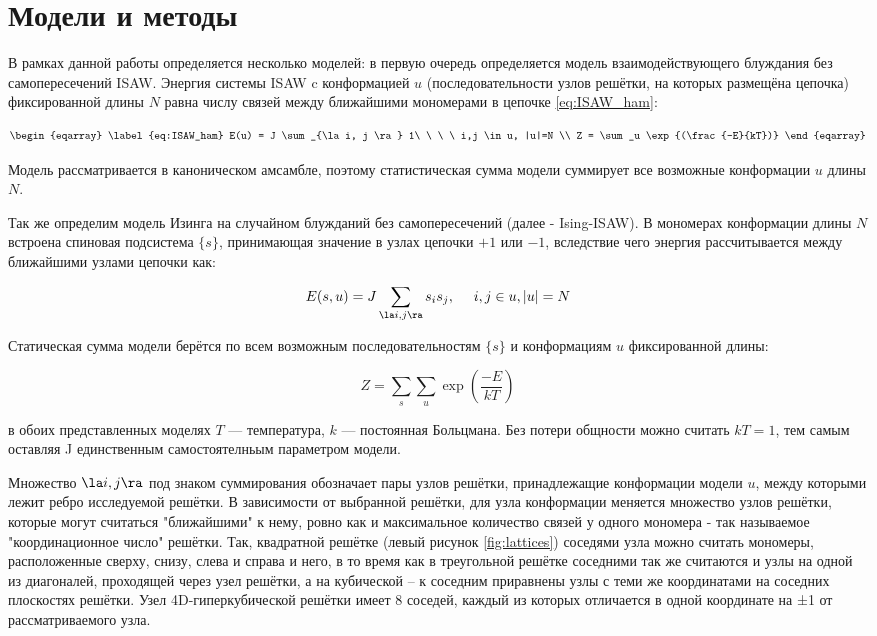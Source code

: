 \section{Модели и методы}

В рамках данной работы определяется несколько моделей: 
в первую очередь определяется модель взаимодействующего блуждания без самопересечений ISAW. 
Энергия системы ISAW c конформацией $u$ (последовательности узлов решётки, на которых размещёна цепочка) 
фиксированной длины $N$ равна числу связей между ближайшими мономерами в цепочке \eqref{eq:ISAW_ham}:

\begin{equation}
\begin{eqarray}
\label{eq:ISAW_ham}
E(u) = J \sum_{\la i, j \ra} 1\ \ \ \ i,j \in u, |u|=N \\
Z = \sum_u \exp{(\frac{-E}{kT})}
\end{eqarray}
\end{equation}

Модель рассматривается в каноническом амсамбле, поэтому статистическая сумма модели суммирует все возможные конформации $u$ длины $N$.

Так же определим модель Изинга на случайном блужданий без самопересечений (далее - Ising-ISAW).
В мономерах конформации длины $N$ встроена спиновая подсистема $\{s\}$, 
принимающая значение в узлах цепочки $+1$ или $-1$, вследствие чего энергия рассчитывается между ближайшими узлами цепочки как:

\begin{equation}
\label{eq:IsISAW_ham}
E(s,u) = J \sum_{\la i, j \ra} s_i s_j,\ \ \ \ i,j \in u, |u|=N
\end{equation}

Статическая сумма модели берётся по всем возможным последовательностям $\{s\}$ и конформациям $u$ фиксированной длины:

\begin{equation}
Z = \sum_s \sum_u \exp{(\frac{-E}{kT})}
\end{equation}

в обоих представленных моделях $T$ — температура, $k$ — постоянная Больцмана. 
Без потери общности можно считать $kT = 1$, тем самым оставляя J единственным самостоятелньым параметром модели.

Множество $\la i, j \ra$ под знаком суммирования обозначает пары узлов решётки, принадлежащие конформации модели $u$, между которыми лежит ребро исследуемой решётки.
В зависимости от выбранной решётки, для узла конформации меняется множество узлов решётки, 
которые могут считаться "ближайшими" к нему, ровно как и максимальное количество связей у одного мономера - так называемое "координационное число" решётки.
Так, квадратной решётке (левый рисунок \ref{fig:lattices}) соседями узла можно считать мономеры, расположенные сверху, снизу, слева и справа и него, 
в то время как в треугольной решётке соседними так же считаются и узлы на одной из диагоналей, проходящей через узел решётки,
а на кубической – к соседним приравнены узлы с теми же координатами на соседних плоскостях решётки.
Узел 4D-гиперкубической решётки имеет 8 соседей, каждый из которых отличается в одной координате на ±1 от рассматриваемого узла.

